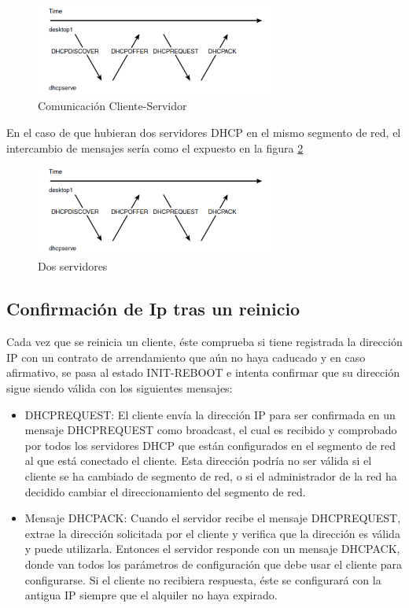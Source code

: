 \begin{figure}
  \centering
    \includegraphics[width=0.7\textwidth]{img/com}
  \caption{Comunicación Cliente-Servidor}
  \label{fig:2}
\end{figure}

En el caso de que hubieran dos servidores DHCP en el mismo segmento de red, el intercambio de mensajes sería como el expuesto en la figura \ref{fig:3}

\begin{figure}
  \centering
    \includegraphics[width=0.7\textwidth]{img/com}
  \caption{Dos servidores}
  \label{fig:3}
\end{figure}

\subsection{Confirmación de Ip tras un reinicio}

Cada vez que se reinicia un cliente, éste comprueba si tiene registrada la dirección IP con un contrato de arrendamiento que aún no haya caducado y en caso afirmativo, se pasa al estado INIT-REBOOT e intenta confirmar que su dirección sigue siendo válida con los siguientes mensajes:
	
	\begin{itemize}
		\item DHCPREQUEST: El cliente envía la dirección IP para ser confirmada en un mensaje DHCPREQUEST como broadcast, el cual es recibido y comprobado por todos los servidores DHCP que están configurados en el segmento de red al que está conectado el cliente. Esta dirección podría no ser válida si el cliente se ha cambiado de segmento de red, o si el administrador de la red ha decidido cambiar el direccionamiento del segmento de red.
		\item Mensaje DHCPACK: Cuando el servidor recibe el mensaje DHCPREQUEST, extrae la dirección solicitada por el cliente y verifica que la dirección es válida y puede utilizarla. Entonces el servidor responde con un mensaje DHCPACK, donde van todos los parámetros de configuración que debe usar el cliente para configurarse. Si el cliente no recibiera respuesta, éste se configurará con la antigua IP siempre que el alquiler no haya expirado.
	\end{itemize}

